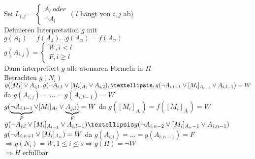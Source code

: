 \noindent
Sei $L_{i,j} = \begin{cases} A_l\ oder \\ \neg A_l \end{cases}$ ( $l$ hängt von $i,j$ ab)\\

\noindent
Definieren Interpretation $g$ mit\\
$g(A_1) = f(A_1) … g(A_n) = f(A_n)$\\
$g(A_{i,j}) = \begin{cases} W, i < l \\ F, i \geq l \end{cases}$\\
Dann interpretiert $g$ alle atomaren Formeln in $H$\\
Betrachten $g(N_i)$\\
$g( [M_I] \OR A_{i,1}, g(\neg A_{i,1} \OR [M_i]_{A_i} \OR A_{i,2}), …, g(\neg A_{i, l-1} \OR [M_i]_{A_{l-1}} \OR A_{i,l-1} ) = W$\\
da $g(A_{i,j}) = … = g(A_{i,l-1}) = W$\\
$g( \underbrace{ \neg A_{i,l-1} }_F \vee [M_i]_{A_l} \vee \underbrace{ A_{j,l}) }_F = W$ da $g([M_i]_{A_l}) = f([M_i]_{A_l}) = W$\\
$g( \neg A_{i.l} \OR [M_i]_{A_{l-1}} \OR A_{i,l-1}) … g(\neg A_{i,n-2} \OR [M_i]_{A_n-1} \OR A_{i,n-1})$ $g( \neg A_{i,n+1} \vee [M_i]_{A_n}) = W$ da $g(A_{i,l}) = … = g(A_{i,n-1}) = F$\\
$\Rightarrow g(N_i) = W, 1 \leq i \leq s \Rightarrow g(H) = \neg W$\\
$\Rightarrow H$ erfüllbar\\
